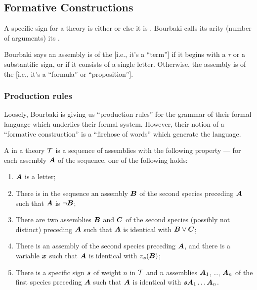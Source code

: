\subsection{Formative Constructions}

\begin{definition}
A specific sign for a theory is either  or else it is
. Bourbaki calls its arity (number of arguments)
its .
\end{definition}

\begin{definition}
Bourbaki says an assembly is of the  [i.e., it's a
  ``term''] if it begins
with a $\tau$ or a substantific sign, or if it consists of a single letter.
Otherwise, the assembly is of the 
[i.e., it's a ``formula'' or ``proposition''].
\end{definition}

\subsubsection{Production rules}
Loosely, Bourbaki is giving us ``production rules'' for the grammar of
their formal language which underlies their formal system. However,
their notion of a ``formative construction'' is a ``firehose of words''
which generate the language.

\begin{definition}
A  in a theory $\mathcal{T}$ is a sequence
of assemblies with the following property --- for each assembly
$\boldsymbol{A}$ of the sequence, one of the following holds:
\begin{enumerate}
\item $\boldsymbol{A}$ is a letter;
\item There is in the sequence an assembly $\boldsymbol{B}$ of the
  second species preceding $\boldsymbol{A}$ such that
  $\boldsymbol{A}$ is $\neg\boldsymbol{B}$;
\item There are two assemblies $\boldsymbol{B}$ and $\boldsymbol{C}$
  of the second species (possibly not distinct) preceding
  $\boldsymbol{A}$ such that $\boldsymbol{A}$ is identical with $\boldsymbol{B}\lor\boldsymbol{C}$;
\item There is an assembly of the second species preceding
  $\boldsymbol{A}$, and there is a variable $\boldsymbol{x}$ such
  that $\boldsymbol{A}$ is identical with $\tau_{\boldsymbol{x}}(\boldsymbol{B})$;
\item There is a specific sign $\boldsymbol{s}$ of weight $n$ in
  $\mathcal{T}$ and $n$ assemblies $\boldsymbol{A}_{1}$, \dots,
  $\boldsymbol{A}_{n}$ of the first species preceding $\boldsymbol{A}$
  such that $\boldsymbol{A}$ is identical with $\boldsymbol{s}\boldsymbol{A}_{1}\dots\boldsymbol{A}_{n}$.
\end{enumerate}
\end{definition}

